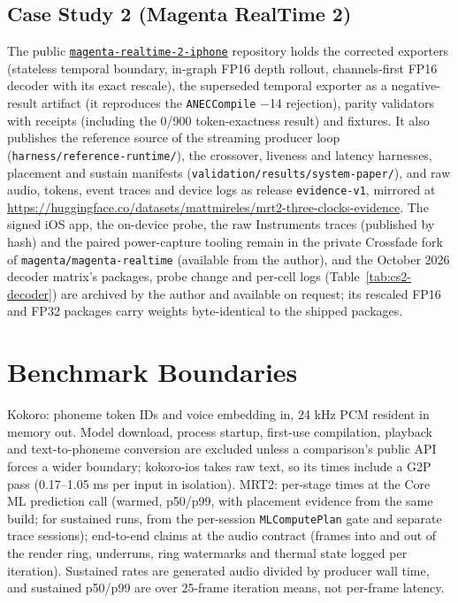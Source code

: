 \documentclass[11pt]{article}
\newcommand{\code}[1]{\texttt{#1}}
\begin{document}
\subsection{Case Study 2 (Magenta RealTime 2)}

The public \href{https://github.com/mattmireles/magenta-realtime-2-iphone}{\code{magenta-realtime-2-iphone}} repository holds the corrected exporters (stateless temporal boundary, in-graph FP16 depth rollout, channels-first FP16 decoder with its exact rescale), the superseded temporal exporter as a negative-result artifact (it reproduces the \code{ANECCompile} $-$14 rejection), parity validators with receipts (including the 0/900 token-exactness result) and fixtures. It also publishes the reference source of the streaming producer loop (\code{harness/reference-runtime/}), the crossover, liveness and latency harnesses, placement and sustain manifests (\code{validation/results/system-paper/}), and raw audio, tokens, event traces and device logs as release \code{evidence-v1}, mirrored at \url{https://huggingface.co/datasets/mattmireles/mrt2-three-clocks-evidence}. The signed iOS app, the on-device probe, the raw Instruments traces (published by hash) and the paired power-capture tooling remain in the private Crossfade fork of \code{magenta/magenta-realtime} (available from the author), and the October 2026 decoder matrix's packages, probe change and per-cell logs (Table~\ref{tab:cs2-decoder}) are archived by the author and available on request; its rescaled FP16 and FP32 packages carry weights byte-identical to the shipped packages.

\section{Benchmark Boundaries}\label{app:boundaries}

Kokoro: phoneme token IDs and voice embedding in, 24 kHz PCM resident in memory out. Model download, process startup, first-use compilation, playback and text-to-phoneme conversion are excluded unless a comparison's public API forces a wider boundary; kokoro-ios takes raw text, so its times include a G2P pass (0.17--1.05 ms per input in isolation). MRT2: per-stage times at the Core ML prediction call (warmed, p50/p99, with placement evidence from the same build; for sustained runs, from the per-session \code{MLComputePlan} gate and separate trace sessions); end-to-end claims at the audio contract (frames into and out of the render ring, underruns, ring watermarks and thermal state logged per iteration). Sustained rates are generated audio divided by producer wall time, and sustained p50/p99 are over 25-frame iteration means, not per-frame latency.
\end{document}
